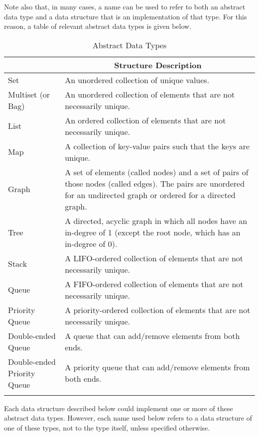 Note also that, in many cases, a name can be used to refer to both an abstract data type and a data structure that is an implementation of that type. For this reason, a table of relevant abstract data types is given below.
	
\begin{table}[H]
	\caption{Abstract Data Types}
	\label{tab:adts}
	\begin{tabularx}{\textwidth}{|l|X|}
		\vtabularspace{2}
		\hline
		\multicolumn{1}{|c|}{Abstract Data Type} & \multicolumn{1}{c|}{Structure Description} \\
		\hline
		Set & An unordered collection of unique values. \\
		\hline
		Multiset (or Bag) & An unordered collection of elements that are not necessarily unique. \\
		\hline
		List & An ordered collection of elements that are not necessarily unique. \\
		\hline
		Map & A collection of key-value pairs such that the keys are unique. \\
		\hline
		Graph & A set of elements (called nodes) and a set of pairs of those nodes (called edges). The pairs are unordered for an undirected graph or ordered for a directed graph.\\
		\hline
		Tree & A directed, acyclic graph in which all nodes have an in-degree of 1 (except the root node, which has an in-degree of 0). \\
		\hline
		Stack & A LIFO-ordered collection of elements that are not necessarily unique.\\
		\hline
		Queue & A FIFO-ordered collection of elements that are not necessarily unique. \\
		\hline
		Priority Queue & A priority-ordered collection of elements that are not necessarily unique. \\
		\hline
		Double-ended Queue & A queue that can add/remove elements from both ends. \\
		\hline
		Double-ended Priority Queue & A priority queue that can add/remove elements from both ends. \\
		\hline
		\vtabularspace{2}
	\end{tabularx}
\end{table}

Each data structure described below could implement one or more of these abstract data types. However, each name used below refers to a data structure of one of these types, not to the type itself, unless specified otherwise. \\

